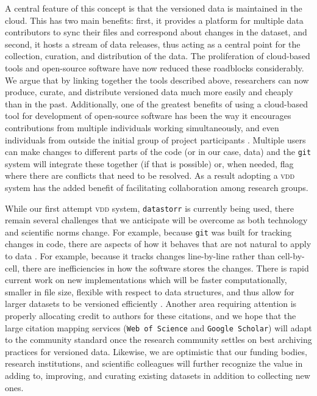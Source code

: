 \documentclass[a4paper,11pt]{article}
\begin{document}
A central feature of this concept is that the versioned data is maintained in the cloud. This has two main benefits: first, it provides a platform for multiple data contributors to sync their files and correspond about changes in the dataset, and second, it hosts a stream of data releases, thus acting as a central point for the collection, curation, and distribution of the data. The proliferation of cloud-based tools and open-source software have now reduced these roadblocks considerably. We argue that by linking together the tools described above, researchers can now produce, curate, and distribute versioned data much more easily and cheaply than in the past. Additionally, one of the greatest benefits of using a cloud-based tool for development of open-source software has been the way it encourages contributions from multiple individuals working simultaneously, and even individuals from outside the initial group of project participants \citep{Rogers-2013}. Multiple users can make changes to different parts of the code (or in our case, data) and the \texttt{git} system will integrate these together (if that is possible) or, when needed, flag where there are conflicts that need to be resolved. As a result adopting a \textsc{vdd} system has the added benefit of facilitating collaboration among research groups.


While our first attempt \textsc{vdd} system, \texttt{datastorr} is currently being used, there remain several challenges that we anticipate will be overcome as both technology and scientific norms change. For example, because \texttt{git} was built for tracking changes in code, there are aspects of how it behaves that are not natural to apply to data \citep{Perkel-2016}. For example, because it tracks changes line-by-line rather than cell-by-cell, there are inefficiencies in how the software stores the changes. There is rapid current work on new implementations which will be faster computationally, smaller in file size, flexible with respect to data structures, and thus allow for larger datasets to be versioned efficiently \citep{Fli, Dat}. Another area requiring attention is properly allocating credit to authors for these citations, and we hope that the large citation mapping services (\texttt{Web of Science} and \texttt{Google Scholar}) will adapt to the community standard once the research community settles on best archiving practices for versioned data. Likewise, we are optimistic that our funding bodies, research institutions, and scientific colleagues will further recognize the value in adding to, improving, and curating existing datasets in addition to collecting new ones.
\end{document}
